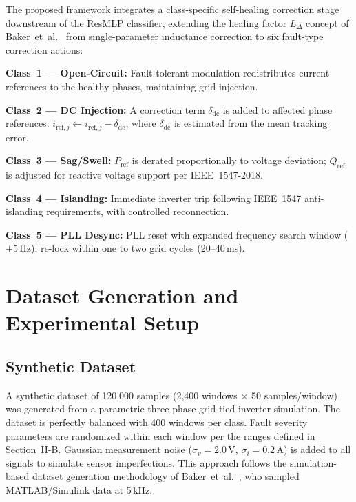 \documentclass[conference]{IEEEtran}
\begin{document}
The proposed framework integrates a class-specific self-healing correction
stage downstream of the ResMLP classifier, extending the healing factor
$L_\Delta$ concept of Baker~et~al.~\cite{baker2021} from single-parameter
inductance correction to six fault-type correction actions:

\textbf{Class~1 --- Open-Circuit:} Fault-tolerant modulation redistributes
current references to the healthy phases, maintaining grid injection.

\textbf{Class~2 --- DC Injection:} A correction term $\delta_{\mathrm{dc}}$
is added to affected phase references:
$i_{\mathrm{ref},j} \leftarrow i_{\mathrm{ref},j} - \delta_{\mathrm{dc}}$,
where $\delta_{\mathrm{dc}}$ is estimated from the mean tracking error.

\textbf{Class~3 --- Sag/Swell:} $P_{\mathrm{ref}}$ is derated
proportionally to voltage deviation; $Q_{\mathrm{ref}}$ is adjusted for
reactive voltage support per IEEE~1547-2018.

\textbf{Class~4 --- Islanding:} Immediate inverter trip following IEEE~1547
anti-islanding requirements, with controlled reconnection.

\textbf{Class~5 --- PLL Desync:} PLL reset with expanded frequency search
window ($\pm 5$\,Hz); re-lock within one to two grid cycles (20--40\,ms).

\section{Dataset Generation and Experimental Setup}

\subsection{Synthetic Dataset}

A synthetic dataset of 120,000 samples (2,400 windows $\times$ 50
samples/window) was generated from a parametric three-phase grid-tied inverter
simulation. The dataset is perfectly balanced with 400 windows per class.
Fault severity parameters are randomized within each window per the ranges
defined in Section~II-B. Gaussian measurement noise
($\sigma_v = 2.0$\,V, $\sigma_i = 0.2$\,A) is added to all signals to
simulate sensor imperfections. This approach follows the simulation-based
dataset generation methodology of Baker~et~al.~\cite{baker2021}, who sampled
MATLAB/Simulink data at 5\,kHz.
\end{document}

